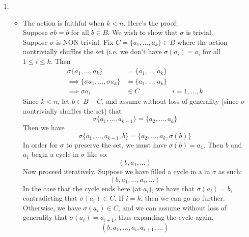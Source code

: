\documentclass{article}
\newcommand{\set}[1]{ \{ #1 \} }
\begin{document}
\subsubsection{}\label{ex7p10}
\begin{enumerate}
\item 
\begin{itemize}

\item The action is faithful when $k<n$. Here's the proof:\\
Suppose $\sigma b = b$ for all $b \in B$. We wish to show that $\sigma$ is trivial.\\
Suppose $\sigma$ is NON-trivial. Fix $C=\set{a_1,\ldots,a_k}\in B$ where the action nontrivially shuffles the set (i.e. we don't have $\sigma(a_i)=a_i$ for all $1\leq i\leq k$. Then  
\begin{align*}
\sigma\set{a_1,\ldots,a_k} &= \set{a_1,\ldots,a_k}\\
\implies\set{\sigma{a_1},\ldots,\sigma{a_k}} &= \set{a_1,\ldots,a_k}\\
\implies \sigma{a_i} &\in C & i=1,\ldots,k
\end{align*}
Since $k<n$, let $b \in B - C$, and assume without loss of generality (since $\sigma$ nontrivially shuffles the set) that
\begin{equation}
\sigma\set{a_1,\ldots,a_{k-1}} = \set{a_2,\ldots,a_k}
\end{equation}
Then we have
\begin{equation}
\sigma\set{a_1,\ldots,a_{k-1},b} = \set{a_2,\ldots,a_k,\sigma(b)}
\end{equation}
In order for $\sigma$ to preserve the set, we must have $\sigma(b)=a_1$. Then $b$ and $a_1$ begin a cycle in $\sigma$ like so:
\begin{equation}
(b, a_1, \ldots)
\end{equation}
Now proceed iteratively. Suppose we have filled a cycle in a in $\sigma$ as such:
\begin{equation}
(b, a_1,\ldots,a_i,\ldots)
\end{equation}
In the case that the cycle ends here (at $a_i$), we have that $\sigma(a_i) = b$, contradicting that $\sigma(a_i)\in C$. If $i=k$, then we can go no further. Otherwise, we have $\sigma(a_i) \in C$, and we can assume without loss of generality that $\sigma(a_i)=a_{i+1}$, thus expanding the cycle again.
\begin{equation}
(b, a_1,\ldots,a_i,a_{i+1},\ldots)
\end{equation}

\end{itemize}
\end{enumerate}
\end{document}
